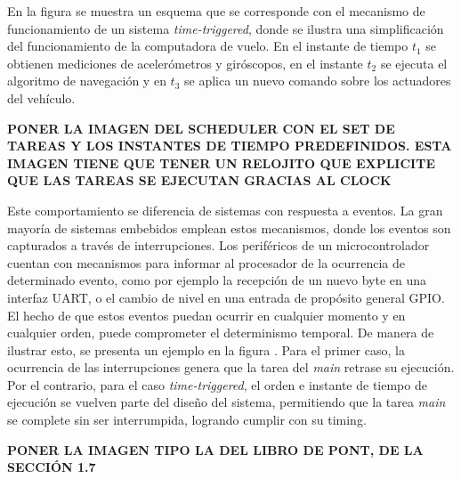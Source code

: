 En la figura  se muestra un esquema que se corresponde con el mecanismo de funcionamiento de un sistema \textit{time-triggered}, donde se ilustra una simplificación del funcionamiento de la computadora de vuelo. En el instante de tiempo $t_1$ se obtienen mediciones de acelerómetros y giróscopos, en el instante $t_2$ se ejecuta el algoritmo de navegación y en $t_3$ se aplica un nuevo comando sobre los actuadores del vehículo.

{\Large \textbf{{\color{red} PONER LA IMAGEN DEL SCHEDULER CON EL SET DE TAREAS Y LOS INSTANTES DE TIEMPO PREDEFINIDOS. ESTA IMAGEN TIENE QUE TENER UN RELOJITO QUE EXPLICITE QUE LAS TAREAS SE EJECUTAN GRACIAS AL CLOCK}}}

Este comportamiento se diferencia de sistemas con respuesta a eventos. La gran mayoría de sistemas embebidos emplean estos mecanismos, donde los eventos son capturados a través de interrupciones. Los periféricos de un microcontrolador cuentan con mecanismos para informar al procesador de la ocurrencia de determinado evento, como por ejemplo la recepción de un nuevo byte en una interfaz UART, o el cambio de nivel en una entrada de propósito general GPIO. El hecho de que estos eventos puedan ocurrir en cualquier momento y en cualquier orden, puede comprometer el determinismo temporal. De manera de ilustrar esto, se presenta un ejemplo en la figura . Para el primer caso, la ocurrencia de las interrupciones genera que la tarea del \textit{main} retrase su ejecución. Por el contrario, para el caso \textit{time-triggered}, el orden e instante de tiempo de ejecución se vuelven parte del diseño del sistema, permitiendo que la tarea \textit{main} se complete sin ser interrumpida, logrando cumplir con su timing.

{\Large \textbf{{\color{red} PONER LA IMAGEN TIPO LA DEL LIBRO DE PONT, DE LA SECCIÓN 1.7}}}





